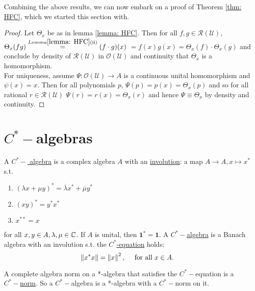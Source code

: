 \documentclass{article}
\begin{document}
Combining the above results, we can now embark on a proof of Theorem \ref{thm: HFC}, which we started this section with.

\begin{proof}
    Let $\Theta_x$ be as in lemma \ref{lemma: HFC}. Then for all $f,g\in \mathcal{R}(\mathcal{U})$, $\Theta_x(fg)\stackrel{Lemma \ref{lemma: HFC}(\text{ii})}{=}(f\cdot g)(x)$ $ = f(x)g(x) = \Theta_x(f)\cdot \Theta_x(g)$ and conclude by density of $\mathcal{R}(\mathcal{U})$ in $\mathcal{O}(\mathcal{U})$ and continuity that $\Theta_x$ is a homomorphism.\\

    For uniqueness, assume $\Psi: \mathcal{O}(\mathcal{U})\to A$ is a continuous unital homomorphism and $\psi(x) = x$. Then for all polynomials $p$, $\Psi(p) = p(x) = \Theta_x(p)$ and so for all rational $r\in \mathcal{R}(\mathcal{U})$ $\Psi(r) = r(x) = \Theta_x(r)$ and hence $\Psi \equiv \Theta_x$ by density and continuity.
\end{proof}

\newpage
\section{$C^*-$algebras}

A \noindent\underline{$C^*-$ algebra} is a complex algebra $A$ with an \noindent\underline{involution}: a map $A\to A, x\mapsto x^*$ s.t. 
\begin{enumerate}[label = (\roman*), align = left, align = left]
    \item $(\lambda x+\mu y)^* = \overline{\lambda}x^*+\overline{\mu}y^*$
    \item $(xy)^* = y^*x^*$
    \item $x^{**} = x$
\end{enumerate}
for all $x,y\in A, \lambda, \mu \in \mathbb{C}$. If $A$ is unital, then $\mathbf{1}^* = \mathbf{1}$. A \noindent\underline{$C^*-$algebra} is a Banach algebra with an involution s.t. the \noindent\underline{$C^*$-equation} holds: 
$$
\left\lVert x^*x\right\rVert= \left\lVert x\right\rVert^2, \quad \text{ for all } x\in A.
$$

A complete algebra norm on a *-algebra that satisfies the $C^*-$equation is a \noindent\underline{$C^*-$norm}. So a $C^*-$algebra is a *-algebra with a $C^*-$norm on it. 
\end{document}
